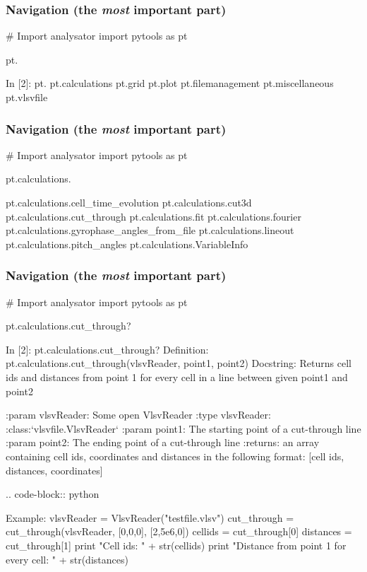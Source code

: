 \documentclass{beamer}
\begin{document}
\begin{frame}[fragile]
 \frametitle{Navigation (the \emph{most} important part)}
 \begin{python}[basicstyle=\tiny]
  # Import analysator
  import pytools as pt
  
  pt.
 \end{python}
 \begin{python}[basicstyle=\tiny]
In [2]: pt.
pt.calculations    pt.grid            pt.plot            
pt.filemanagement  pt.miscellaneous   pt.vlsvfile    
 \end{python}
\end{frame}

\begin{frame}[fragile]
 \frametitle{Navigation (the \emph{most} important part)}
 \begin{python}[basicstyle=\tiny]
  # Import analysator
  import pytools as pt
  
  pt.calculations.
 \end{python}
 \begin{python}[basicstyle=\tiny]
pt.calculations.cell_time_evolution
pt.calculations.cut3d
pt.calculations.cut_through
pt.calculations.fit
pt.calculations.fourier
pt.calculations.gyrophase_angles_from_file
pt.calculations.lineout
pt.calculations.pitch_angles
pt.calculations.VariableInfo
 \end{python}
\end{frame}

\begin{frame}[fragile]
 \frametitle{Navigation (the \emph{most} important part)}
 \begin{python}[basicstyle=\tiny]
  # Import analysator
  import pytools as pt
  
  pt.calculations.cut_through?
 \end{python}
 \begin{python}[basicstyle=\tiny]
In [2]: pt.calculations.cut_through?
Definition: pt.calculations.cut_through(vlsvReader, point1, point2)
Docstring:
Returns cell ids and distances from point 1 for every cell in a line between 
given point1 and point2

:param vlsvReader:       Some open VlsvReader
:type vlsvReader:        :class:`vlsvfile.VlsvReader`
:param point1:           The starting point of a cut-through line
:param point2:           The ending point of a cut-through line
:returns: an array containing cell ids, coordinates and distances in the following 
format: [cell ids, distances, coordinates]

.. code-block:: python

   Example:
   vlsvReader = VlsvReader("testfile.vlsv")
   cut_through = cut_through(vlsvReader, [0,0,0], [2,5e6,0])
   cellids = cut_through[0]
   distances = cut_through[1]
   print "Cell ids: " + str(cellids)
   print "Distance from point 1 for every cell: " + str(distances)

 \end{python}
\end{frame}
\end{document}
